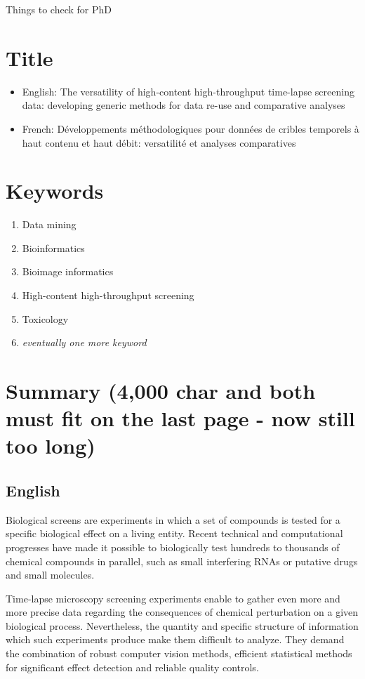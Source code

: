 \documentclass[12pt]{article}
\begin{document}
Things to check for PhD
\section{Title}
\begin{itemize}
\item English: The versatility of high-content high-throughput time-lapse screening data: developing generic methods for data re-use and comparative analyses
\item French: Développements méthodologiques pour données de cribles temporels à haut contenu et haut débit: versatilité et analyses comparatives
\end{itemize}
\section{Keywords}
\begin{enumerate}
\item Data mining
\item Bioinformatics
\item Bioimage informatics
\item High-content high-throughput screening
\item Toxicology
\item \textit{eventually one more keyword}
\end{enumerate}


\section{Summary (4,000 char and both must fit on the last page - now still too long)}
\subsection{English}
Biological screens are experiments in which a set of compounds is tested for a specific biological effect on a living entity. Recent technical and computational progresses have made it possible to biologically test hundreds to thousands of chemical compounds in parallel, such as small interfering RNAs or putative drugs and small molecules.

Time-lapse microscopy screening experiments enable to gather even more and more precise data regarding the consequences of chemical perturbation on a given biological process. Nevertheless, the quantity and specific structure of information which such experiments produce make them difficult to analyze. They demand the combination of robust computer vision methods, efficient statistical methods for significant effect detection and reliable quality controls.
\end{document}
